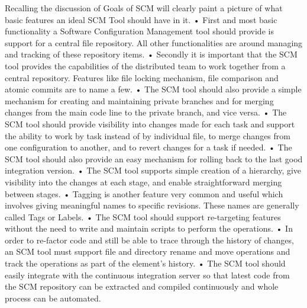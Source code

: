 Recalling the discussion of Goals of SCM will clearly paint a picture of what basic features an ideal SCM Tool should have in it.
•       First and most basic functionality a Software Configuration Management tool should provide is support for a central file repository. All other functionalities are around
managing and tracking of these repository items.
•       Secondly it is important that the SCM tool provides the capabilities of the distributed team to work together from a central repository. Features like file locking
mechanism, file comparison and atomic commits are to name a few.
•       The SCM tool should also provide a simple mechanism for creating and maintaining private branches and for merging changes from the main code line to the private branch, and
vice versa.
•       The SCM tool should provide visibility into changes made for each task and support the ability to work by task instead of by individual file, to merge changes from one
configuration to another, and to revert changes for a task if needed.
•       The SCM tool should also provide an easy mechanism for rolling back to the last good integration version.
•       The SCM tool supports simple creation of a hierarchy, give visibility into the changes at each stage, and enable straightforward merging between stages.
•       Tagging is another feature very common and useful which involves giving meaningful names to specific revisions. These names are generally called Tags or Labels.
•       The SCM tool should support re-targeting features without the need to write and maintain scripts to perform the operations.
•       In order to re-factor code and still be able to trace through the history of changes, an SCM tool must support file and directory rename and move operations and track the
operations as part of the element’s history.
•       The SCM tool should easily integrate with the continuous integration server so that latest code from the SCM repository can be extracted and compiled continuously and whole
process can be automated.

